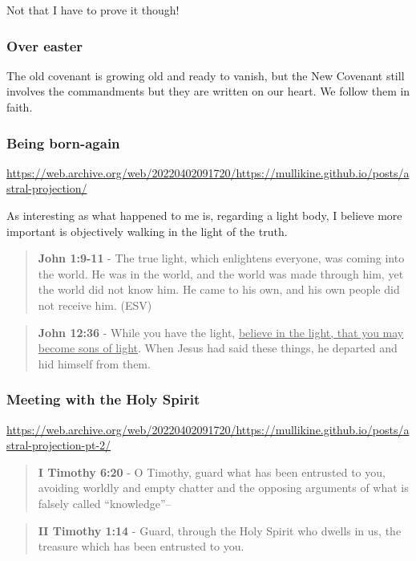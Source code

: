 \documentclass[11pt]{article}
\begin{document}
Not that I have to prove it though!

\subsubsection{Over easter}
\label{sec:org0509894}
The old covenant is growing old and ready to vanish, but the New Covenant still involves the commandments but they are written on our heart.
We follow them in faith.

\subsubsection{Being born-again}
\label{sec:orgdf164ed}
\url{https://web.archive.org/web/20220402091720/https://mullikine.github.io/posts/astral-projection/}

As interesting as what happened to me is, regarding a light body, I believe more important is objectively walking in the light of the truth.

\begin{quote}
\textbf{John 1:9-11} - The true light, which enlightens everyone, was coming into the world. He was in the world, and the world was made through him, yet the world did not know him. He came to his own, and his own people did not receive him. (ESV)
\end{quote}

\begin{quote}
\textbf{John 12:36} - While you have the light, \uline{believe in the light, that you may become sons of light}. When Jesus had said these things, he departed and hid himself from them.
\end{quote}

\subsubsection{Meeting with the Holy Spirit}
\label{sec:org1ef41ae}
\url{https://web.archive.org/web/20220402091720/https://mullikine.github.io/posts/astral-projection-pt-2/}

\begin{quote}
\textbf{I Timothy 6:20} - O Timothy, guard what has been entrusted to you, avoiding worldly and empty chatter and the opposing arguments of what is falsely called “knowledge”--
\end{quote}

\begin{quote}
\textbf{II Timothy 1:14} - Guard, through the Holy Spirit who dwells in us, the treasure which has been entrusted to you.
\end{quote}
\end{document}
